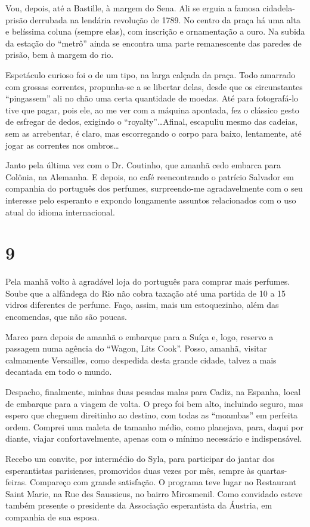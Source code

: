 Vou, depois, até a Bastille, à margem do Sena. Ali se erguia a famosa cidadela- prisão derrubada na lendária revolução de 1789. No centro da praça há uma alta e belíssima coluna (sempre elas), com inscrição e ornamentação a ouro. Na subida da estação do ``metrô'' ainda se encontra uma parte remanescente das paredes de prisão, bem à margem do rio.

Espetáculo curioso foi o de um tipo, na larga calçada da praça. Todo amarrado com grossas correntes, propunha-se a se libertar delas, desde que os circunstantes ``pingassem'' ali no chão uma certa quantidade de moedas. Até para fotografá-lo tive que pagar, pois ele, ao me ver com a máquina apontada, fez o clássico gesto de esfregar de dedos, exigindo o ``royalty''\ldots Afinal, escapuliu mesmo das cadeias, sem as arrebentar, é claro, mas escorregando o corpo para baixo, lentamente, até jogar as correntes nos ombros\ldots

Janto pela última vez com o Dr. Coutinho, que amanhã cedo embarca para Colônia, na Alemanha. E depois, no café reencontrando o patrício Salvador em companhia do português dos perfumes, surpreendo-me agradavelmente com o seu interesse pelo esperanto e expondo longamente assuntos relacionados com o uso atual do idioma internacional.

\section*{9 \adfflatleafright {}}
Pela manhã volto à agradável loja do português para comprar mais perfumes. Soube que a alfândega do Rio não cobra taxação até uma partida de 10 a 15 vidros diferentes de perfume. Faço, assim, mais um estoquezinho, além das encomendas, que não são poucas.

Marco para depois de amanhã o embarque para a Suíça e, logo, reservo a passagem numa agência do ``Wagon, Lits Cook''. Posso, amanhã, visitar calmamente Versailles, como despedida desta grande cidade, talvez a mais decantada em todo o mundo.

Despacho, finalmente, minhas duas pesadas malas para Cadiz, na Espanha, local de embarque para a viagem de volta. O preço foi bem alto, incluindo seguro, mas espero que cheguem direitinho ao destino, com todas as ``moambas'' em perfeita ordem. Comprei uma maleta de tamanho médio, como planejava, para, daqui por diante, viajar confortavelmente, apenas com o mínimo necessário e indispensável.

Recebo um convite, por intermédio do Syla, para participar do jantar dos esperantistas parisienses, promovidos duas vezes por mês, sempre às quartas-feiras. Compareço com grande satisfação. O programa teve lugar no Restaurant Saint Marie, na Rue des Saussieus, no bairro Mirosmenil. Como convidado esteve também presente o presidente da Associação esperantista da Áustria, em companhia de sua esposa.

